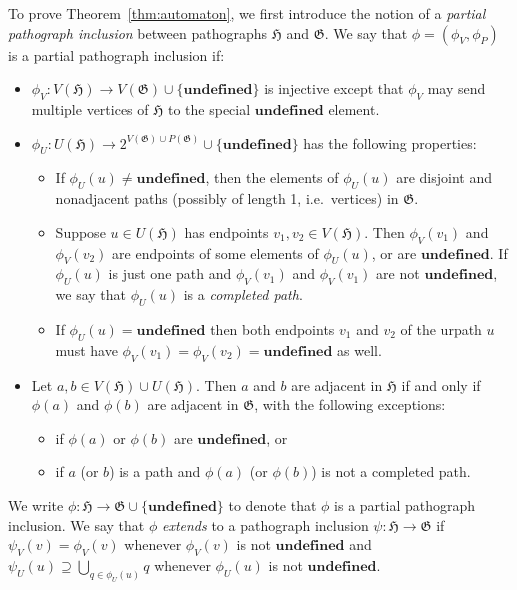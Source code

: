 \documentclass{article}
\newcommand{\Gf}{\mathfrak{G}}
\newcommand{\Hf}{\mathfrak{H}}
\newcommand{\ud}{\mathbf{undefined}}
\begin{document}
To prove Theorem~\ref{thm:automaton}, we first introduce the notion of a \textit{partial pathograph inclusion} between pathographs $\Hf$ and $\Gf$. We say that $\phi=(\phi_V, \phi_P)$ is a partial pathograph inclusion if:
\begin{itemize}
    \item $\phi_V:V(\Hf)\to V(\Gf)\cup\{\ud\}$ is injective except that $\phi_V$ may send multiple vertices of $\Hf$ to the special $\ud$ element.
    \item $\phi_U:U(\Hf)\to 2^{V(\Gf)\cup P(\Gf)}\cup\{\ud\}$ has the following properties:
    \begin{itemize}
        \item If $\phi_U(u)\ne \ud$, then the elements of $\phi_U(u)$ are disjoint and nonadjacent paths (possibly of length 1, i.e.\ vertices) in $\Gf$.
        \item Suppose $u\in U(\Hf)$ has endpoints $v_1,v_2\in V(\Hf)$. Then $\phi_V(v_1)$ and $\phi_V(v_2)$ are endpoints of some elements of $\phi_U(u)$, or are $\ud$. If $\phi_U(u)$ is just one path and $\phi_V(v_1)$ and $\phi_V(v_1)$ are not $\ud$, we say that $\phi_U(u)$ is a \textit{completed path}.
        \item If $\phi_U(u)=\ud$ then both endpoints $v_1$ and $v_2$ of the urpath $u$ must have $\phi_V(v_1)=\phi_V(v_2)=\ud$ as well.
    \end{itemize}
    \item Let $a,b\in V(\Hf)\cup U(\Hf)$. Then $a$ and $b$ are adjacent in $\Hf$ if and only if $\phi(a)$ and $\phi(b)$ are adjacent in $\Gf$, with the following exceptions:
    \begin{itemize}
        \item if $\phi(a)$ or $\phi(b)$ are $\ud$, or
        \item if $a$ (or $b$) is a path and $\phi(a)$ (or $\phi(b)$) is not a completed path.
    \end{itemize}
\end{itemize}
We write $\phi:\Hf\to\Gf\cup\{\ud\}$ to denote that $\phi$ is a partial pathograph inclusion. We say that $\phi$ \textit{extends} to a pathograph inclusion $\psi:\Hf\to\Gf$ if $\psi_V(v)=\phi_V(v)$ whenever $\phi_V(v)$ is not $\ud$ and $\psi_U(u)\supseteq \bigcup_{q\in \phi_U(u)}q$ whenever $\phi_U(u)$ is not $\ud$.
\end{document}
